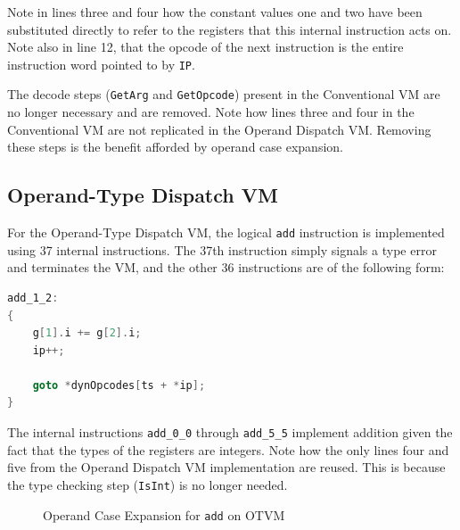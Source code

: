 \documentclass[english,a4paper,12pt]{report}
\begin{document}
Note in lines three and four how the constant values one and two have
been substituted directly to refer to the registers that this internal
instruction acts on.  Note also in line 12, that the opcode of the
next instruction is the entire instruction word pointed to by
\verb|IP|.

The decode steps (\verb|GetArg| and \verb|GetOpcode|) present in the
Conventional VM are no longer necessary and are removed. Note how
lines three and four in the Conventional VM are not replicated in the
Operand Dispatch VM. Removing these steps is the benefit afforded by
operand case expansion.

\subsection{Operand-Type Dispatch VM}
\label{sec:operand-type-dispatch-implementation}

For the Operand-Type Dispatch VM, the logical \verb|add| instruction
is implemented using 37 internal instructions. The 37th instruction
simply signals a type error and terminates the VM, and the other 36
instructions are of the following form:

\begin{lstlisting}[language=C]
add_1_2:
{
    g[1].i += g[2].i;
    ip++;

    goto *dynOpcodes[ts + *ip];
}
\end{lstlisting}

The internal instructions \verb|add_0_0| through \verb|add_5_5|
implement addition given the fact that the types of the registers are
integers. Note how the only lines four and five from the Operand
Dispatch VM implementation are reused. This is because the type
checking step (\verb|IsInt|) is no longer needed.

\begin{figure}[!htb]
	\centering
	\caption{Operand Case Expansion for \texttt{add} on OTVM}
	\label{fig:op-case-expansion-implementation-2}	
\end{figure}
\end{document}
